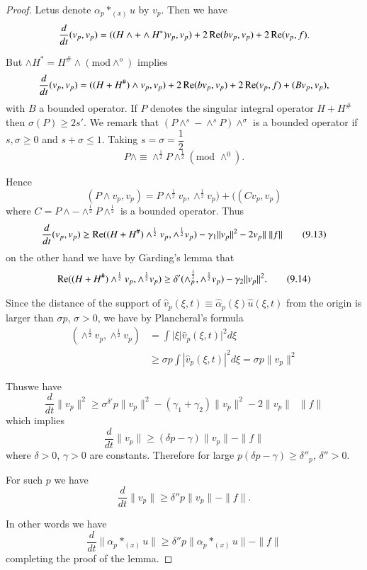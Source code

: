\begin{proof}
Let\pageoriginale us denote $\alpha_p  *_{(x)}u$ by $v_p$. Then we
have   
$$
\frac{d}{d t} (v_p, v_p) = (( H \wedge  + \wedge H^*)v_p, v_p) + 2 \operatorname{Re} 
(bv_p, v_p) + 2 \operatorname{Re} (v_p, f). 
$$

But $\wedge H^* = H^{\#} \wedge (\text{mod} \wedge^o)$ implies
 $$
 \frac{d}{dt}(v_p, v_p) =  (( H + H^{\#}) \wedge v_p , v_p) +  2  \operatorname{Re} 
 (bv_p, v_p) + 2  \operatorname{Re} (v_p, f) + (Bv_p,  v_p), 
 $$
 with $B$ a bounded operator. If $P$ denotes the singular integral
 operator $H + H^{\#}$ then $\sigma (P)\ge 2 s'$. We remark that $(P
 \wedge^s - \wedge^s P) \wedge^\sigma$ is a bounded operator if $s,
 \sigma \ge 0$ and  $s + \sigma \le 1$. Taking $s= \sigma =
 \dfrac{1}{2}$ 
 $$
 P \wedge \equiv \wedge^{\frac{1}{2}} P \wedge^{\frac{1}{2}} (\text{mod~}
 \wedge^0). 
 $$

 Hence 
 $$
 (P \wedge v_p, v_p) = P \wedge^{\frac{1}{2}} v_p,
 \wedge^{\frac{1}{2}} v_p) + ((C v_p, v_p)  
 $$
 where $C = P \wedge - \wedge^{\frac{1}{2}} P \wedge^{\frac{1}{2}}$
 is a bounded operator. Thus 
 \begin{equation}
\frac{d}{d t} (v_p, v_p) \ge \operatorname{Re} ((H +H^{\#}) \wedge^{\frac{1}{2}}
v_p, \wedge^{\frac{1}{2}} v_p) - \gamma_1 \| v_p \|^2 -2 v_p \|\;  \| f
\|   \tag{9.13} \label{chap3-eq9.13}
 \end{equation} 
 on the other hand we have by G$\ring{\text{a}}$rding's lemma that  
\begin{equation}
\operatorname{Re} ((H +H^{\#}) \wedge^{\frac{1}{2}} v_p, \wedge^{\frac{1}{2}}v_p)
\ge \delta' (\wedge^{\frac{1}{2}}_{p}, \wedge^{\frac{1}{2}} v_p) -
\gamma_2 \|  v_p \| ^2. \tag{9.14} \label{chap3-eq9.14}
 \end{equation} 

  Since the distance of the support of $\hat{v}_p (\xi, t) \equiv
  \hat{\alpha}_p (\xi) \hat{u} (\xi, t)$ from the origin is larger
  than $\sigma p$, $\sigma > 0$, we have by Plancheral's formula 
 \begin{align*}
(\wedge^{\frac{1}{2}} v_p, \wedge^{\frac{1}{2}} v_p) & = \int |\xi
   |\hat{v}_p (\xi, t) |^2 d \xi \\ 
& \ge \sigma p  \int | \hat{v}_p (\xi, t) |^2 d \xi = \sigma p \| v_p
   \|^2  
 \end{align*} 

Thus\pageoriginale we have 
 $$
 \frac{d}{d t} \|v_p \|^2 \ge \sigma^{\delta'} p \|v_p \|^2 - (\gamma_1 +
 \gamma_2) \|v_p \|^2 - 2 \| v_p \|\;\;  \| f \| 
 $$
 which implies
 $$
 \frac{d}{dt} \|v_p \| \ge ( \delta p - \gamma) \|  v_p \| - \| f \|  
 $$ 
 where  $\delta > 0 $, $\gamma > 0$ are constants. Therefore for large
 $p ( \delta p- \gamma) \ge \delta'' _p$, $\delta'' >0$. 
 
For such $p$ we have 
$$
 \frac{d}{dt} \| v_p \| \ge \delta '' p \| v_p \| - \|  f \|. 
$$ 

In other words we have
\begin{equation}
\frac{d}{dt} \| \alpha_p *_{(x)}u \| \ge \delta '' p \| \alpha_p
*_{(x)}u \| - \|  f \| \tag{9.12}\label{chap3-eq9.12} 
\end{equation} 
completing the proof of the lemma.
\end{proof}

